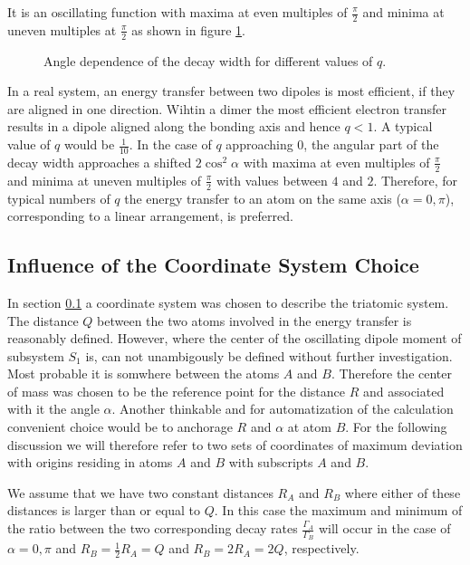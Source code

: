 It is an oscillating function with maxima at even multiples of $\frac \pi 2$
and minima at uneven multiples at $\frac \pi 2$ as shown in figure \ref{figure:etmd_angle}.

\begin{figure}[h]
 \centering
 
 \caption{Angle dependence of the decay width for different values of $q$.}
 \label{figure:etmd_angle}
\end{figure}

In a real system, an energy transfer between
two dipoles is most efficient, if they are aligned in one direction.
Wihtin a dimer the most efficient electron transfer results in a
dipole aligned along the bonding axis and hence $q<1$. A typical
value of $q$ would be $\frac 1{10}$. In the 
case of $q$ approaching 0, the angular part of
the decay width
approaches a shifted $2\cos^2 \alpha$ with maxima at even multiples of $\frac \pi2$
and minima at uneven multiples of $\frac \pi2$ with values between
$4$ and $2$.
Therefore, for typical numbers of $q$ the energy transfer
to an atom on the same axis ($\alpha = 0,\pi$), corresponding
to a linear arrangement, is preferred.



\subsection{Influence of the Coordinate System Choice}
In section \ref{} a coordinate system was chosen to describe the
triatomic system. The distance $Q$ between the two atoms involved
in the energy transfer is reasonably defined. However, where the
center of the oscillating dipole moment of subsystem $S_1$ is, can
not unambigously be defined without further investigation. Most
probable it is somwhere between the atoms $A$ and $B$. Therefore
the center of mass was chosen to be the reference point for the
distance $R$ and associated with it the angle $\alpha$.
Another thinkable and for automatization of the calculation
convenient choice would be to anchorage $R$ and $\alpha$ at
atom $B$.
For the following discussion we will therefore refer to two sets
of coordinates of maximum deviation with origins residing in atoms
$A$ and $B$ with subscripts $A$ and $B$.

We assume that we have two constant distances $R_{A}$ and $R_B$
where either of these distances is larger than or equal to $Q$.
In this case the maximum and minimum of the ratio between the two
corresponding decay rates $\frac{\Gamma_{A}}{\Gamma_B}$ will occur
in the case of $\alpha = 0,\pi$ and $R_B = \frac 12 R_{A} = Q$
and $R_B = 2 R_{A} = 2Q$, respectively.

